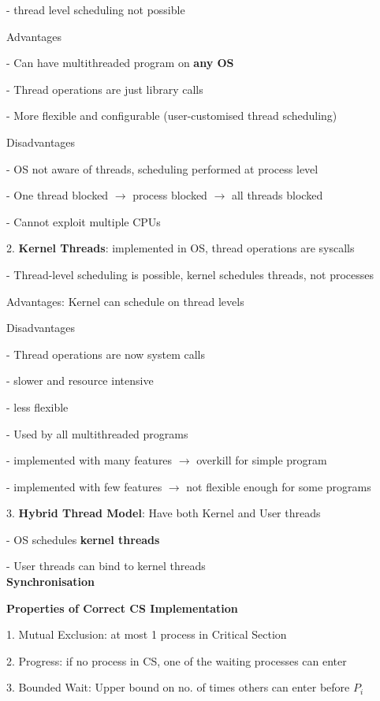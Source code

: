 \documentclass[10pt, a4paper]{article}
\newcommand{\highlight}[1]{{\color{red}\textbf{#1}}}
\newcommand{\red}[1]{{\color{red}#1}}
\newcommand{\green}[1]{{\color{ForestGreen}#1}}
\newcommand{\header}[1]{{\normalsize\textbf{#1}}}
\newcommand{\tab}[0]{\hspace*{2mm}}
\begin{document}
\begin{multicols*}{3}
		\tab{} - thread level scheduling \red{not possible}

		\green{Advantages}

		- Can have multithreaded program on \textbf{any OS}

		- Thread operations are just library calls

		- More flexible and configurable (user-customised thread scheduling)

		\red{Disadvantages}

		- OS not aware of threads, scheduling performed at process level

		\tab{} - One thread blocked $\rightarrow$ process blocked $\rightarrow$ all threads blocked

		\tab{} - Cannot exploit multiple CPUs

		2. \textbf{Kernel Threads}: implemented in OS, thread operations are \red{syscalls}

		- Thread-level scheduling \green{is possible}, kernel schedules threads, not processes

		\green{Advantages}: Kernel can schedule on thread levels

		\red{Disadvantages}

		- Thread operations are now system calls

		\tab{} - slower and resource intensive

		- less flexible

		\tab{} - Used by all multithreaded programs

		\tab{} - implemented with many features $\rightarrow$ overkill for simple program

		\tab{} - implemented with few features $\rightarrow$ not flexible enough for some programs

		3. \textbf{Hybrid Thread Model}: Have both Kernel and User threads

		- OS schedules \highlight{kernel threads}

		- \green{User threads} can bind to \red{kernel threads}\\

		\header{Synchronisation}

		\textbf{Properties of Correct CS Implementation}

		1. Mutual Exclusion: at most 1 process in Critical Section

		2. Progress: if no process in CS, one of the waiting processes can enter

		3. Bounded Wait: Upper bound on no. of times others can enter before $P_i$


\end{multicols*}
\end{document}

